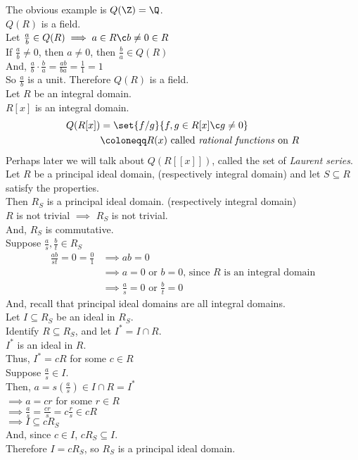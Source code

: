 The obvious example is $Q(\Z)=\Q$. \\
\note $Q(R)$ is a field. \\
\pf Let $\frac ab\in Q(R)\implies a\in R\c b\neq0\in R$ \\
If $\frac ab\neq0$, then $a\neq0$, then $\frac ba\in Q(R)$ \\
And, $\frac ab\cdot\frac ba=\frac{ab}{ba}=\frac11=1$ \\
So $\frac ab$ is a unit.  Therefore $Q(R)$ is a field. \\
\ex Let $R$ be an integral domain.\\
$R[x]$ is an integral domain.
\begin{align*}
Q(R[x]) & = \set{f/g}{f,g\in R[x]\c g\neq0} \\
&\coloneqq R(x) \text{ called \emph{rational functions} on $R$}
\end{align*}
Perhaps later we will talk about $Q(R[[x]])$, called the set of \emph{Laurent series}. \\
\prop Let $R$ be a principal ideal domain, (respectively integral domain) and let $S\subseteq R$ satisfy the properties. \\
Then $R_S$ is a principal ideal domain.  (respectively integral domain) \\
\pf $R$ is not trivial $\implies$ $R_S$ is not trivial. \\
And, $R_S$ is commutative. \\
Suppose $\frac as,\frac bt\in R_S$
\begin{align*}
\frac{ab}{st} = 0 = \frac01 &\implies ab = 0 \\
&\implies a=0 \text{ or } b=0 \text{, since $R$ is an integral domain} \\
&\implies \tfrac as = 0 \text{ or } \tfrac bt = 0
\end{align*}
And, recall that principal ideal domains are all integral domains. \\
Let $I\subseteq R_S$ be an ideal in $R_S$. \\
Identify $R\subseteq R_S$, and let $I^*=I\cap R$. \\
\check $I^*$ is an ideal in $R$. \\
Thus, $I^*=cR$ for some $c\in R$ \\
Suppose $\frac as\in I$. \\
Then, $a=s(\frac as)\in I\cap R=I^*$ \\
$\implies a=cr$ for some $r\in R$ \\
$\implies \frac as=\frac{cr}s=c\frac rs\in cR$ \\
$\implies I\subseteq cR_S$ \\
And, since $c\in I$, $cR_S\subseteq I$. \\
Therefore $I=cR_S$, so $R_S$ is a principal ideal domain.
